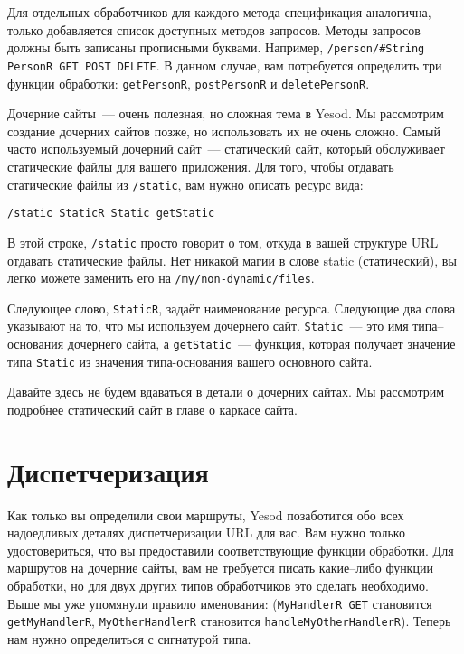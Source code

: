 Для отдельных обработчиков для каждого метода спецификация аналогична,
только добавляется список доступных методов запросов. Методы запросов
должны быть записаны прописными буквами. Например,
\lstinline!/person/#String PersonR GET POST DELETE!.
В данном случае, вам потребуется определить три функции обработки:
\lstinline!getPersonR!, \lstinline!postPersonR! и \lstinline!deletePersonR!.

Дочерние сайты~--- очень полезная, но сложная тема в Yesod. Мы рассмотрим
создание дочерних сайтов позже, 
но использовать их не очень сложно. Самый
часто используемый дочерний сайт~--- статический сайт, который
обслуживает статические файлы для вашего приложения. Для того, чтобы
отдавать статические файлы из \lstinline!/static!, вам нужно описать
ресурс вида:
\begin{verbatim}
/static StaticR Static getStatic
\end{verbatim}

В этой строке, \lstinline!/static! просто говорит о том, откуда в вашей
структуре URL отдавать статические файлы. Нет никакой магии в слове
static (статический), вы легко можете заменить его на
\lstinline!/my/non-dynamic/files!.

Следующее слово, \lstinline!StaticR!, задаёт наименование
ресурса. Следующие два слова указывают на то, что мы используем
дочернего сайт. \lstinline!Static!~--- это имя типа--основания дочернего сайта, а
\lstinline!getStatic!~--- функция, которая получает значение типа
\lstinline!Static! из значения типа-основания вашего основного сайта.

Давайте здесь не будем вдаваться в детали о дочерних сайтах. Мы рассмотрим
подробнее статический сайт в главе о каркасе
сайта.

\section{Диспетчеризация}
Как только вы определили свои маршруты, Yesod позаботится обо всех
надоедливых деталях диспетчеризации URL для вас. Вам нужно только
удостовериться, что вы предоставили соответствующие функции
обработки. Для маршрутов на дочерние сайты, вам не требуется писать
какие--либо функции обработки, но для двух других типов обработчиков
это сделать необходимо. Выше мы уже упомянули правило именования:
(\lstinline!MyHandlerR GET! становится \lstinline!getMyHandlerR!,
\lstinline!MyOtherHandlerR! становится \lstinline!handleMyOtherHandlerR!).
Теперь нам нужно определиться с сигнатурой типа.

